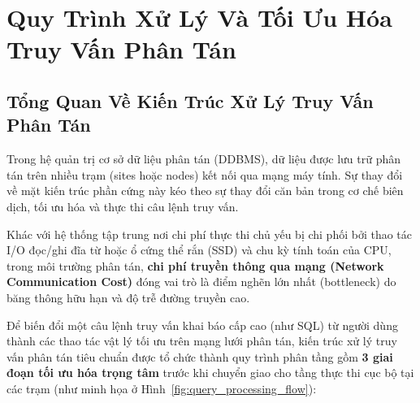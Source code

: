\documentclass[12pt,a4paper]{report}
\begin{document}
\chapter{Quy Trình Xử Lý Và Tối Ưu Hóa Truy Vấn Phân Tán}

\section{Tổng Quan Về Kiến Trúc Xử Lý Truy Vấn Phân Tán}
Trong hệ quản trị cơ sở dữ liệu phân tán (DDBMS), dữ liệu được lưu trữ phân tán trên nhiều trạm (sites hoặc nodes) kết nối qua mạng máy tính. Sự thay đổi về mặt kiến trúc phần cứng này kéo theo sự thay đổi căn bản trong cơ chế biên dịch, tối ưu hóa và thực thi câu lệnh truy vấn.

Khác với hệ thống tập trung nơi chi phí thực thi chủ yếu bị chi phối bởi thao tác I/O đọc/ghi đĩa từ hoặc ổ cứng thể rắn (SSD) và chu kỳ tính toán của CPU, trong môi trường phân tán, \textbf{chi phí truyền thông qua mạng (Network Communication Cost)} đóng vai trò là điểm nghẽn lớn nhất (bottleneck) do băng thông hữu hạn và độ trễ đường truyền cao.

Để biến đổi một câu lệnh truy vấn khai báo cấp cao (như SQL) từ người dùng thành các thao tác vật lý tối ưu trên mạng lưới phân tán, kiến trúc xử lý truy vấn phân tán tiêu chuẩn được tổ chức thành quy trình phân tầng gồm \textbf{3 giai đoạn tối ưu hóa trọng tâm} trước khi chuyển giao cho tầng thực thi cục bộ tại các trạm (như minh họa ở Hình~\ref{fig:query_processing_flow}):
\end{document}
